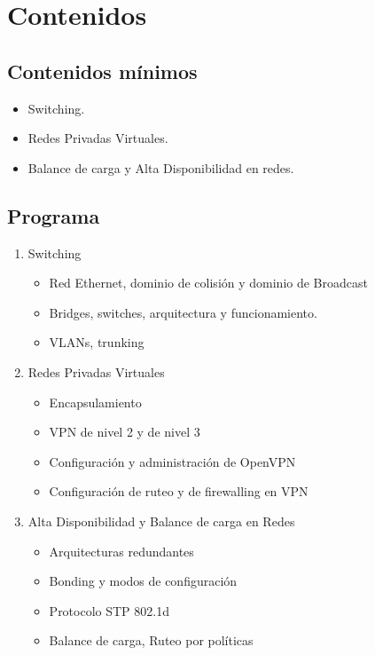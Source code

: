 \section {Contenidos}
\subsection{Contenidos mínimos}
\begin{itemize} 
	\item Switching. 
	\item Redes Privadas Virtuales. 
	\item Balance de carga y Alta Disponibilidad en redes. 
\end{itemize}


\subsection {Programa}
\begin{enumerate}
	\item Switching
		\begin{itemize}
			\item Red Ethernet, dominio de colisión y dominio de Broadcast
			\item Bridges, switches, arquitectura y funcionamiento. 
			\item VLANs, trunking
		\end{itemize}
	\item Redes Privadas Virtuales
		\begin{itemize}
			\item Encapsulamiento
			\item VPN de nivel 2 y de nivel 3
			\item Configuración y administración de OpenVPN
			\item Configuración de ruteo y de firewalling en VPN
		\end{itemize}
	\item Alta Disponibilidad y Balance de carga en Redes
		\begin{itemize}
			\item Arquitecturas redundantes 
			\item Bonding y modos de configuración
			\item Protocolo STP 802.1d
			\item Balance de carga, Ruteo por políticas
		\end{itemize}

\end{enumerate}

